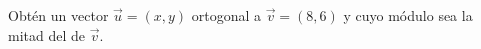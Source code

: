 \vspace{-8mm}
\begin{flushright}
\begin{footnotesize} \textcolor{gris}{}	\end{footnotesize}
\end{flushright}


\begin{mipropuesto}

Obtén un vector $\vec u=(x, y)$ ortogonal a $\vec v=(8, 6)$ y cuyo módulo sea la mitad del de $\vec v$.	
\end{mipropuesto}

\vspace{-8mm}
\begin{flushright}
\begin{footnotesize} \textcolor{gris}{}	\end{footnotesize}
\end{flushright}

\vspace{10mm}

